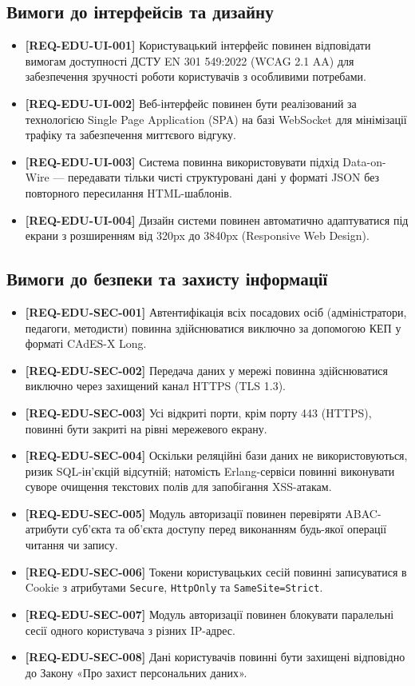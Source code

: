 \documentclass{article}
\begin{document}
\subsection{Вимоги до інтерфейсів та дизайну}
\begin{itemize}
    \item \textbf{[REQ-EDU-UI-001]} Користувацький інтерфейс повинен відповідати вимогам доступності ДСТУ EN 301 549:2022 (WCAG 2.1 AA) для забезпечення зручності роботи користувачів з особливими потребами.
    \item \textbf{[REQ-EDU-UI-002]} Веб-інтерфейс повинен бути реалізований за технологією Single Page Application (SPA) на базі WebSocket для мінімізації трафіку та забезпечення миттєвого відгуку.
    \item \textbf{[REQ-EDU-UI-003]} Система повинна використовувати підхід Data-on-Wire --- передавати тільки чисті структуровані дані у форматі JSON без повторного пересилання HTML-шаблонів.
    \item \textbf{[REQ-EDU-UI-004]} Дизайн системи повинен автоматично адаптуватися під екрани з розширенням від 320px до 3840px (Responsive Web Design).
\end{itemize}

\subsection{Вимоги до безпеки та захисту інформації}
\begin{itemize}
    \item \textbf{[REQ-EDU-SEC-001]} Автентифікація всіх посадових осіб (адміністратори, педагоги, методисти) повинна здійснюватися виключно за допомогою КЕП у форматі CAdES-X Long.
    \item \textbf{[REQ-EDU-SEC-002]} Передача даних у мережі повинна здійснюватися виключно через захищений канал HTTPS (TLS 1.3).
    \item \textbf{[REQ-EDU-SEC-003]} Усі відкриті порти, крім порту 443 (HTTPS), повинні бути закриті на рівні мережевого екрану.
    \item \textbf{[REQ-EDU-SEC-004]} Оскільки реляційні бази даних не використовуються, ризик SQL-ін'єкцій відсутній; натомість Erlang-сервіси повинні виконувати суворе очищення текстових полів для запобігання XSS-атакам.
    \item \textbf{[REQ-EDU-SEC-005]} Модуль авторизації повинен перевіряти ABAC-атрибути суб'єкта та об'єкта доступу перед виконанням будь-якої операції читання чи запису.
    \item \textbf{[REQ-EDU-SEC-006]} Токени користувацьких сесій повинні записуватися в Cookie з атрибутами \texttt{Secure}, \texttt{HttpOnly} та \texttt{SameSite=Strict}.
    \item \textbf{[REQ-EDU-SEC-007]} Модуль авторизації повинен блокувати паралельні сесії одного користувача з різних IP-адрес.
    \item \textbf{[REQ-EDU-SEC-008]} Дані користувачів повинні бути захищені відповідно до Закону «Про захист персональних даних».
\end{itemize}
\end{document}
